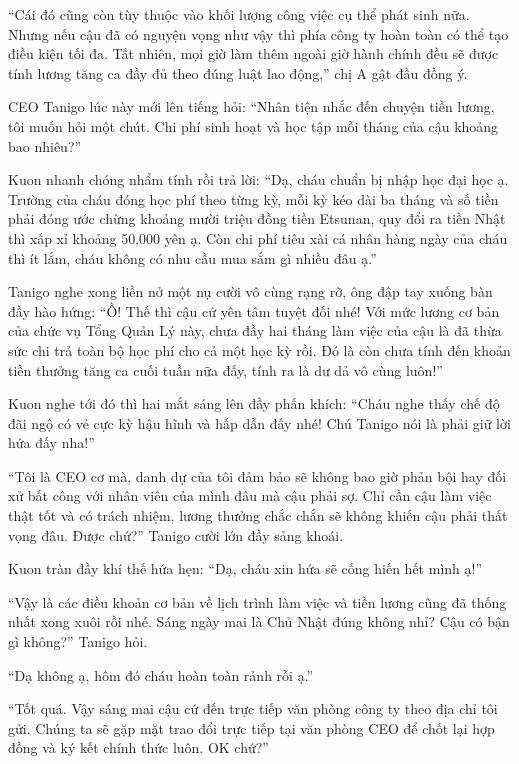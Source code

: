 \documentclass[../main.tex]{subfiles}
\begin{document}
``Cái đó cũng còn tùy thuộc vào khối lượng công việc cụ thể phát sinh nữa. Nhưng nếu cậu đã có nguyện vọng như vậy thì phía công ty hoàn toàn có thể tạo điều kiện tối đa. Tất nhiên, mọi giờ làm thêm ngoài giờ hành chính đều sẽ được tính lương tăng ca đầy đủ theo đúng luật lao động,'' chị A gật đầu đồng ý.

CEO Tanigo lúc này mới lên tiếng hỏi: ``Nhân tiện nhắc đến chuyện tiền lương, tôi muốn hỏi một chút. Chi phí sinh hoạt và học tập mỗi tháng của cậu khoảng bao nhiêu?''

Kuon nhanh chóng nhẩm tính rồi trả lời: ``Dạ, cháu chuẩn bị nhập học đại học ạ. Trường của cháu đóng học phí theo từng kỳ, mỗi kỳ kéo dài ba tháng và số tiền phải đóng ước chừng khoảng mười triệu đồng tiền Etsunan, quy đổi ra tiền Nhật thì xấp xỉ khoảng 50,000 yên ạ. Còn chi phí tiêu xài cá nhân hàng ngày của cháu thì ít lắm, cháu không có nhu cầu mua sắm gì nhiều đâu ạ.''

Tanigo nghe xong liền nở một nụ cười vô cùng rạng rỡ, ông đập tay xuống bàn đầy hào hứng: ``Ồ! Thế thì cậu cứ yên tâm tuyệt đối nhé! Với mức lương cơ bản của chức vụ Tổng Quản Lý này, chưa đầy hai tháng làm việc của cậu là đã thừa sức chi trả toàn bộ học phí cho cả một học kỳ rồi. Đó là còn chưa tính đến khoản tiền thưởng tăng ca cuối tuần nữa đấy, tính ra là dư dả vô cùng luôn!''

Kuon nghe tới đó thì hai mắt sáng lên đầy phấn khích: ``Cháu nghe thấy chế độ đãi ngộ có vẻ cực kỳ hậu hĩnh và hấp dẫn đấy nhé! Chú Tanigo nói là phải giữ lời hứa đấy nha!''

``Tôi là CEO cơ mà, danh dự của tôi đảm bảo sẽ không bao giờ phản bội hay đối xử bất công với nhân viên của mình đâu mà cậu phải sợ. Chỉ cần cậu làm việc thật tốt và có trách nhiệm, lương thưởng chắc chắn sẽ không khiến cậu phải thất vọng đâu. Được chứ?'' Tanigo cười lớn đầy sảng khoái.

Kuon tràn đầy khí thế hứa hẹn: ``Dạ, cháu xin hứa sẽ cống hiến hết mình ạ!''

``Vậy là các điều khoản cơ bản về lịch trình làm việc và tiền lương cũng đã thống nhất xong xuôi rồi nhé. Sáng ngày mai là Chủ Nhật đúng không nhỉ? Cậu có bận gì không?'' Tanigo hỏi.

``Dạ không ạ, hôm đó cháu hoàn toàn rảnh rỗi ạ.''

``Tốt quá. Vậy sáng mai cậu cứ đến trực tiếp văn phòng công ty theo địa chỉ tôi gửi. Chúng ta sẽ gặp mặt trao đổi trực tiếp tại văn phòng CEO để chốt lại hợp đồng và ký kết chính thức luôn. OK chứ?''
\end{document}
